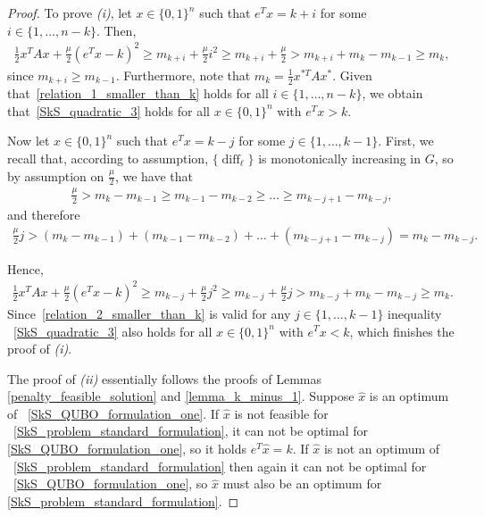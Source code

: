 \documentclass{article}
\DeclareMathOperator{\diff}{diff}
\begin{document}
\begin{proof}
To prove {\it (i)}, let $x \in \{0, 1\}^n$ such that $e^Tx = k + i$ for some $i \in \{1, \ldots, n-k\}$. Then,
\begin{align}\label{relation_1_smaller_than_k}
\frac{1}{2} x^T A x + \frac{\mu}{2}(e^Tx - k)^2 \geq m_{k+i} + \frac{\mu}{2} i^2 \geq m_{k+i} + \frac{\mu}{2}  > m_{k+i} + m_k - m_{k-1} \geq m_k,
\end{align}
since $m_{k+i} \geq m_{k-1}$. Furthermore, note that $m_k = \frac{1}{2} x^{*T} A x^*$. Given that~\eqref{relation_1_smaller_than_k} holds for all $i \in \{1, \ldots, n-k\}$, we obtain that~\eqref{SkS_quadratic_3} holds for all $x \in \{0, 1\}^n$ with $e^Tx > k$. 

Now let $x \in \{0, 1\}^n$ such that $e^T x = k - j$ for some $j \in \{1, \ldots, k - 1\}$. First, we recall that, according to assumption, $\{\diff_\ell\}$ is monotonically increasing in $G$, so by assumption on $\frac{\mu}{2}$, we have that
\begin{align*}
\frac{\mu}{2} > m_{k} - m_{k-1} \geq m_{k-1} - m_{k-2} \geq \ldots \geq m_{k-j+1} - m_{k-j},
\end{align*}
and therefore
\begin{align*}
\frac{\mu}{2} j > (m_k - m_{k-1}) + (m_{k-1} - m_{k-2}) + \ldots + (m_{k-j+1} - m_{k-j}) = m_k - m_{k - j}.
\end{align*}

Hence,
\begin{align}\label{relation_2_smaller_than_k}
\frac{1}{2} x^T A x + \frac{\mu}{2}(e^Tx - k)^2 \geq m_{k-j} + \frac{\mu}{2} j^2 \geq m_{k-j} + \frac{\mu}{2} j > m_{k-j} + m_k - m_{k-j} \geq m_k.
\end{align}
Since~\eqref{relation_2_smaller_than_k} is valid for any $j \in \{1, \ldots, k-1\}$ inequality ~\eqref{SkS_quadratic_3} also holds for all $x \in \{0, 1\}^n$ with $e^Tx < k$, which finishes the proof of {\it (i)}.

The proof of {\it (ii)} essentially follows the proofs of Lemmas \ref{penalty_feasible_solution} and \ref{lemma_k_minus_1}.
Suppose $\hat x$ is an optimum of ~\eqref{SkS_QUBO_formulation_one}. If $\hat x$ is not feasible for ~\eqref{SkS_problem_standard_formulation}, it can not be optimal for 
\eqref{SkS_QUBO_formulation_one}, so it holds $e^T\hat x=k$.
If $\hat x$ is not an optimum of ~\eqref{SkS_problem_standard_formulation} then again it can not be optimal for  ~\eqref{SkS_QUBO_formulation_one}, so $\hat x$ must also be an optimum for 
\eqref{SkS_problem_standard_formulation}.
\end{proof}
\end{document}
